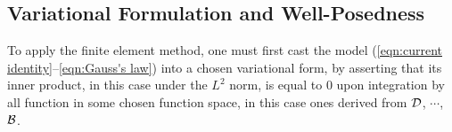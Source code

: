\subsection{Variational Formulation and Well-Posedness}
    
    To apply the finite element method, one must first cast the model (\ref{eqn:current identity}–\ref{eqn:Gauss's law}) into a chosen variational form, by asserting that its inner product, in this case under the $L^{2}$ norm, is equal to $0$ upon integration by all function in some chosen function space, in this case ones derived from $\mathcal{D}$, $\cdots$, $\mathcal{B}$.
    
    
    
    